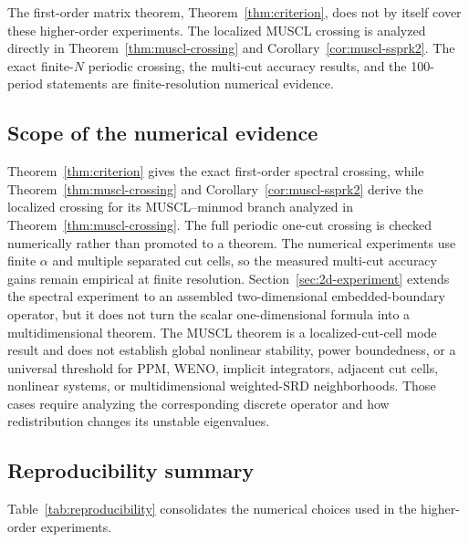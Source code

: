 \documentclass[preprint,12pt]{elsarticle}
\begin{document}
The first-order matrix theorem, Theorem~\ref{thm:criterion}, does not by
itself cover these higher-order experiments.  The localized MUSCL crossing is analyzed directly in
Theorem~\ref{thm:muscl-crossing} and Corollary~\ref{cor:muscl-ssprk2}.
The exact finite-$N$ periodic crossing, the multi-cut accuracy results, and
the 100-period statements are finite-resolution numerical evidence.


\subsection*{Scope of the numerical evidence}
Theorem~\ref{thm:criterion} gives the exact first-order spectral crossing,
while Theorem~\ref{thm:muscl-crossing} and
Corollary~\ref{cor:muscl-ssprk2} derive the localized crossing for its
MUSCL--minmod branch analyzed in Theorem~\ref{thm:muscl-crossing}.  The full periodic one-cut
crossing is checked numerically rather than promoted to a theorem.
The numerical experiments use finite $\alpha$ and multiple separated cut
cells, so the measured multi-cut accuracy gains remain empirical at finite
resolution.  Section~\ref{sec:2d-experiment} extends the spectral experiment
to an assembled two-dimensional embedded-boundary operator, but it does not
turn the scalar one-dimensional formula into a multidimensional theorem.  The
MUSCL theorem is a localized-cut-cell mode result and does not establish global
nonlinear stability, power boundedness, or a universal threshold for PPM,
WENO, implicit integrators, adjacent cut cells, nonlinear systems, or
multidimensional weighted-SRD neighborhoods.  Those cases require
analyzing the corresponding discrete operator and how redistribution changes
its unstable eigenvalues.

\subsection*{Reproducibility summary}
Table~\ref{tab:reproducibility} consolidates the numerical choices used in the
higher-order experiments.
\end{document}
